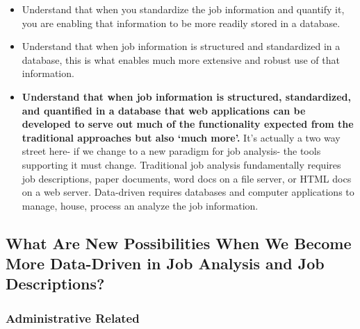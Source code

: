 \documentclass[12pt,letterpaper]{article}
\begin{document}
{{{\begin{itemize}
  \begin{itemize}
  \item
    understanding the presence or absence of tasks, knowledge, and
    skills, qualifications in any `one' job out of the total picture the
    tasks knowledge, skills and qualifications needed is a form of
    measurement
  \item
    understanding that capturing of `levels' of knowledge, skills, and
    qualifications on some sort of scale is in fact -measurement.
  \item
    understanding that time spent on various tasks is measurement
  \end{itemize}
\item
  Understand that when you standardize the job information and quantify
  it, you are enabling that information to be more readily stored in a
  database.
\item
  Understand that when job information is structured and standardized in
  a database, this is what enables much more extensive and robust use of
  that information.
\item
  \textbf{Understand that when job information is structured,
  standardized, and quantified in a database that web applications can
  be developed to serve out much of the functionality expected from the
  traditional approaches but also `much more'.} It's actually a two way
  street here- if we change to a new paradigm for job analysis- the
  tools supporting it must change. Traditional job analysis
  fundamentally requires job descriptions, paper documents, word docs on
  a file server, or HTML docs on a web server. Data-driven requires
  databases and computer applications to manage, house, process an
  analyze the job information.
\end{itemize}

\subsection{What Are New Possibilities When We Become More
Data-Driven in Job Analysis and Job
Descriptions?}

\subsubsection{Administrative Related}

}}}
\end{document}
